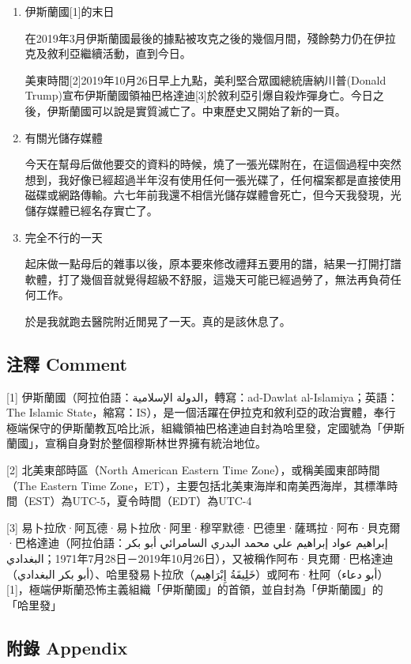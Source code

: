 \documentclass[a5paper, 12pt
]{book}
\begin{document}
\begin{enumerate}
\def\labelenumi{\arabic{enumi}.}
\item
  伊斯蘭國{[}1{]}的末日

  在2019年3月伊斯蘭國最後的據點被攻克之後的幾個月間，殘餘勢力仍在伊拉克及敘利亞繼續活動，直到今日。

  美東時間{[}2{]}2019年10月26日早上九點，美利堅合眾國總統唐納川普(Donald
  Trump)宣布伊斯蘭國領袖巴格達迪{[}3{]}於敘利亞引爆自殺炸彈身亡。今日之後，伊斯蘭國可以說是實質滅亡了。中東歷史又開始了新的一頁。
\item
  有關光儲存媒體

  今天在幫母后做他要交的資料的時候，燒了一張光碟附在，在這個過程中突然想到，我好像已經超過半年沒有使用任何一張光碟了，任何檔案都是直接使用磁碟或網路傳輸。六七年前我還不相信光儲存媒體會死亡，但今天我發現，光儲存媒體已經名存實亡了。
\item
  完全不行的一天

  起床做一點母后的雜事以後，原本要來修改禮拜五要用的譜，結果一打開打譜軟體，打了幾個音就覺得超級不舒服，這幾天可能已經過勞了，無法再負荷任何工作。

  於是我就跑去醫院附近閒晃了一天。真的是該休息了。
\end{enumerate}

\hypertarget{ux6ce8ux91cb-comment-22}{%
\subsection{注釋 Comment}\label{ux6ce8ux91cb-comment-22}}

{[}1{]} 伊斯蘭國（阿拉伯語：الدولة الإسلامية‎，轉寫：ad-Dawlat
al-Islamiya；英語：The Islamic
State，縮寫：IS），是一個活躍在伊拉克和敘利亞的政治實體，奉行極端保守的伊斯蘭教瓦哈比派，組織領袖巴格達迪自封為哈里發，定國號為「伊斯蘭國」，宣稱自身對於整個穆斯林世界擁有統治地位。

{[}2{]} 北美東部時區（North American Eastern Time
Zone），或稱美國東部時間（The Eastern Time
Zone，ET），主要包括北美東海岸和南美西海岸，其標準時間（EST）為UTC-5，夏令時間（EDT）為UTC-4

{[}3{]}
易卜拉欣·阿瓦德·易卜拉欣·阿里·穆罕默德·巴德里·薩瑪拉·阿布·貝克爾·巴格達迪（阿拉伯語：إبراهيم
عواد إبراهيم علي محمد البدري السامرائي أبو بكر
البغدادي‎；1971年7月28日－2019年10月26日），又被稱作阿布·貝克爾·巴格達迪（أبو
بكر البغدادي‎）、哈里發易卜拉欣（خَلِيفَةُ
إِبْرَاهِيم‎）或阿布·杜阿（أبو
دعاء‎）{[}1{]}，極端伊斯蘭恐怖主義組織「伊斯蘭國」的首領，並自封為「伊斯蘭國」的「哈里發」

\hypertarget{ux9644ux9304-appendix-21}{%
\subsection{附錄 Appendix}\label{ux9644ux9304-appendix-21}}
\end{document}
